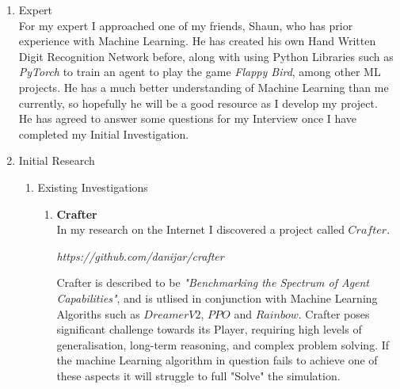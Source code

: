 \begin{flushleft}
\begin{enumerate}
        \vspace{1cm}
        \item {\Large Expert} \\
            \vspace{0.2cm}
            For my expert I approached one of my friends, Shaun, who has prior experience with Machine Learning. He has
            created his own Hand Written Digit Recognition Network before, along with using Python Libraries such as 
            \textit{PyTorch} to train an agent to play the game \textit{Flappy Bird}, among other ML projects. He has 
            a much better understanding of Machine Learning than me currently, so hopefully he will be a good resource 
            as I develop my project. \\
            \vspace{0.2cm}
            He has agreed to answer some questions for my Interview once I have completed my Initial Investigation.

        \vspace{1cm}
        \item {\Large Initial Research} \\
            \begin{enumerate}
                \item {\Large Existing Investigations} \\
                    \begin{enumerate}
                        \item {\Large \textbf{Crafter}} \\
                        \vspace{0.2cm}
                            In my research on the Internet I discovered a project called $Crafter$. \\

                            \vspace{0.2cm}
                            \centerline{\textit{https://github.com/danijar/crafter}}
                            \vspace{0.2cm}

                            Crafter is described to be \textit{"Benchmarking the Spectrum of Agent Capabilities"}, and is utlised
                            in conjunction with Machine Learning Algoriths such as $DreamerV2$, $PPO$ and $Rainbow$. Crafter poses significant
                            challenge towards its Player, requiring high levels of generalisation, long-term reasoning, and complex 
                            problem solving. If the machine Learning algorithm in question fails to achieve one of these aspects it will 
                            struggle to full "Solve" the simulation. \\


\end{enumerate}
\end{enumerate}
\end{enumerate}
\end{flushleft}
